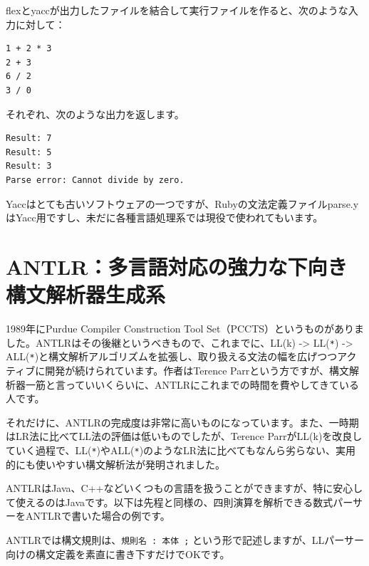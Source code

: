 flexとyaccが出力したファイルを結合して実行ファイルを作ると、次のような入力に対して：

\begin{verbatim}
1 + 2 * 3
2 + 3
6 / 2
3 / 0
\end{verbatim}

それぞれ、次のような出力を返します。

\begin{verbatim}
Result: 7
Result: 5
Result: 3
Parse error: Cannot divide by zero.
\end{verbatim}

Yaccはとても古いソフトウェアの一つですが、Rubyの文法定義ファイルparse.yはYacc用ですし、未だに各種言語処理系では現役で使われてもいます。

\hypertarget{chapter6-antlrux591aux8a00ux8a9eux5bfeux5fdcux306eux5f37ux529bux306aux4e0bux5411ux304dux69cbux6587ux89e3ux6790ux5668ux751fux6210ux7cfb}{%
\section{ANTLR：多言語対応の強力な下向き構文解析器生成系}\label{chapter6-antlrux591aux8a00ux8a9eux5bfeux5fdcux306eux5f37ux529bux306aux4e0bux5411ux304dux69cbux6587ux89e3ux6790ux5668ux751fux6210ux7cfb}}

1989年にPurdue Compiler Construction Tool
Set（PCCTS）というものがありました。ANTLRはその後継というべきもので、これまでに、LL(k)
-\textgreater{} LL(\texttt{*}) -\textgreater{}
ALL(\texttt{*})と構文解析アルゴリズムを拡張し、取り扱える文法の幅を広げつつアクティブに開発が続けられています。作者はTerence
Parrという方ですが、構文解析器一筋と言っていいくらいに、ANTLRにこれまでの時間を費やしてきている人です。

それだけに、ANTLRの完成度は非常に高いものになっています。また、一時期はLR法に比べてLL法の評価は低いものでしたが、Terence
ParrがLL(k)を改良していく過程で、LL(\texttt{*})やALL(\texttt{*})のようなLR法に比べてもなんら劣らない、実用的にも使いやすい構文解析法が発明されました。

ANTLRはJava、C++などいくつもの言語を扱うことができますが、特に安心して使えるのはJavaです。以下は先程と同様の、四則演算を解析できる数式パーサーをANTLRで書いた場合の例です。

ANTLRでは構文規則は、\texttt{規則名\ :\ 本体\ ;}
という形で記述しますが、LLパーサー向けの構文定義を素直に書き下すだけでOKです。

